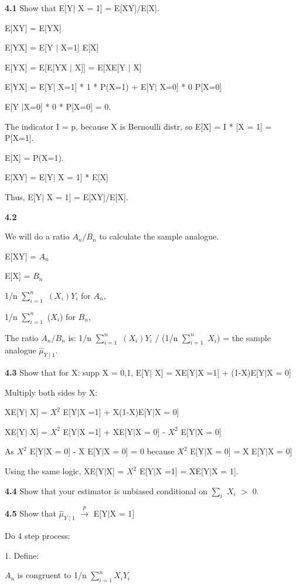 \textbf{4.1} Show that E[Y$\mid$ X = 1] = E[XY]/E[X].

E[XY] = E[YX]

E[YX] = E[Y $\mid$ X=1] E[X]

E[YX] = E[E[YX $\mid$ X]]  = E[XE[Y $\mid$ X]

E[YX] = E[Y$\mid$ X=1] * 1 * P(X=1) + E[Y$\mid$ X=0] * 0 P[X=0]

E[Y $\mid$X=0] * 0 * P[X=0] = 0.

The indicator I = p, because X is Bernoulli distr, so E[X] = I * [X = 1] = P[X=1].

E[X] = P(X=1).

E[XY] = E[Y$\mid$ X = 1] * E[X]

Thus, E[Y$\mid$ X = 1] = E[XY]/E[X].

\textbf{4.2}

We will do a ratio $A_{n} / B_{n}$ to calculate the sample analogue.

E[XY] = $A_{n}$

E[X] = $B_{n}$

1/n $\sum^n_{i=1}$ $(X_{i})Y_{i}$ for $A_{n}$,

1/n $\sum^n_{i=1}$ ($X_{i}$) for $B_n$, 

The ratio $A_{n}/B_{n}$ is: 
1/n $\sum^n_{i=1}$ $(X_{i})Y_{i}$ / (1/n $\sum^n_{i=1}$ $X_{i}$) = the sample analogue $\hat{\mu}_{Y\mid 1}$.


\textbf{4.3} Show that for X: supp X = {0,1}, E[Y$\mid$ X] = XE[Y$\mid$X =1] + (1-X)E[Y$\mid$X = 0]  

Multiply both sides by X:

XE[Y$\mid$ X] = $X^{2}$ E[Y$\mid$X =1] + X(1-X)E[Y$\mid$X = 0]

XE[Y$\mid$ X] = $X^{2}$ E[Y$\mid$X =1] + XE[Y$\mid$X = 0] - $X^{2}$ E[Y$\mid$X = 0]

As $X^{2}$ E[Y$\mid$X = 0] - X E[Y$\mid$X = 0] = 0 because 
$X^{2}$ E[Y$\mid$X = 0] = X E[Y$\mid$X = 0]

Using the same logic, XE[Y$\mid$X] = $X^{2}$ E[Y$\mid$X =1] = XE[Y$\mid$X = 1].

\textbf{4.4}
Show that your estimator is unbiased conditional on $\sum_{i}$ $X_{i}$ $>$ 0.

\textbf{4.5} Show that $\hat{\mu}_{Y\mid1}$ $\xrightarrow{p}$ E[Y$\mid$X = 1]

Do 4 step process:

1.
Define:

$A_{n}$ is congruent to 1/n $\sum^n_{i=1} X_{i}Y_{i}$


